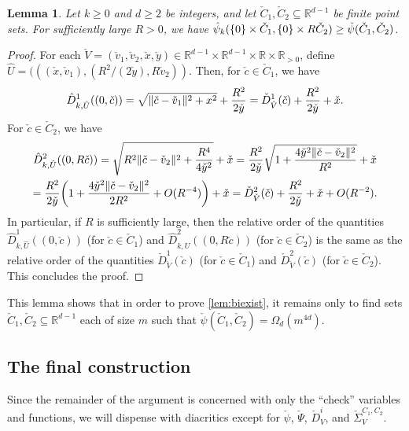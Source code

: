 \documentclass[11pt]{amsart}
\newtheorem{lemma}[theorem]{Lemma}
\theoremstyle{definition}
\DeclarePairedDelimiter{\paren}{(}{)}
\DeclarePairedDelimiter{\set}{\{}{\}}
\DeclarePairedDelimiter{\Abs}{\lVert}{\rVert}
\newcommand{\RR}{\mathbb{R}}
\begin{document}
\begin{lemma}\label{lem:thing}
Let $k \geq 0$ and $d \geq 2$ be integers, and let $\check C_1, \check C_2 \subseteq \RR^{d-1}$ be finite point sets.  For sufficiently large $R > 0$, we have $\hat \psi_k(\set{0} \times \check C_1, \set{0} \times R\check C_2) \geq \check \psi(\check C_1, \check C_2)$.
\end{lemma}
\begin{proof}
For each $\check V = (\check v_1,\check v_2,\check x,\check y) \in \RR^{d-1} \times \RR^{d-1} \times \RR \times \RR_{>0}$, define $\hat U = (((\check x, \check  v_1), (R^2/(2\check y), R\check v_2))$. Then, for $\check c \in \check C_1$, we have
\[\hat D^1_{k, \hat U}((0, \check c)) = \sqrt{\Abs{\check c - \check v_1}^2+x^2} + \frac{R^2}{2\check y} = \check D^1_{\check V}(\check c) + \frac{R^2}{2\check y} + \check x.\]
For $\check c \in \check C_2$, we have
\begin{multline*}
\hat D^2_{k, \hat U}((0, R\check c)) = \sqrt{R^2\Abs{\check c - \check v_2}^2 + \frac{R^4}{4\check y^2}} + \check x = \frac{R^2}{2\check y} \sqrt{1 + \frac{4\check y^2\Abs{\check c - \check v_2}^2}{R^2}} + \check x \\
= \frac{R^2}{2\check y}\paren*{1 + \frac{4\check y^2\Abs{\check c - \check v_2}^2}{2R^2} + O(R^{-4})} + \check x 
= \check D_{\check V}^2(\check c) + \frac{R^2}{2\check y} + \check x + O(R^{-2}).
\end{multline*}
In particular, if $R$ is sufficiently large, then the relative order of the quantities $\hat D^1_{k, \hat U}((0, \check c))$ (for $\check c \in \check C_1$) and $\hat D^2_{k, \hat U}((0, R\check c))$ (for $\check c \in \check C_2$) is the same as the relative order of the quantities $\check D^1_{\check V}(\check c)$ (for $\check c \in \check C_1$) and $\check D^2_{\check V}(\check c)$ (for $\check c \in \check C_2$).  This concludes the proof.
\end{proof}
This lemma shows that in order to prove \cref{lem:biexist}, it remains only to find sets $\check C_1,\check C_2 \subseteq \RR^{d-1}$ each of size $m$ such that $\check\psi(\check C_1,\check C_2) = \Omega_{d}(m^{4d})$.

\subsection{The final construction}
Since the remainder of the argument is concerned with only the ``check'' variables and functions, we will dispense with diacritics except for $\check \psi$, $\check \Psi$, $\check D_V^i$, and $\check \Sigma_V^{C_1,C_2}$.
\end{document}
